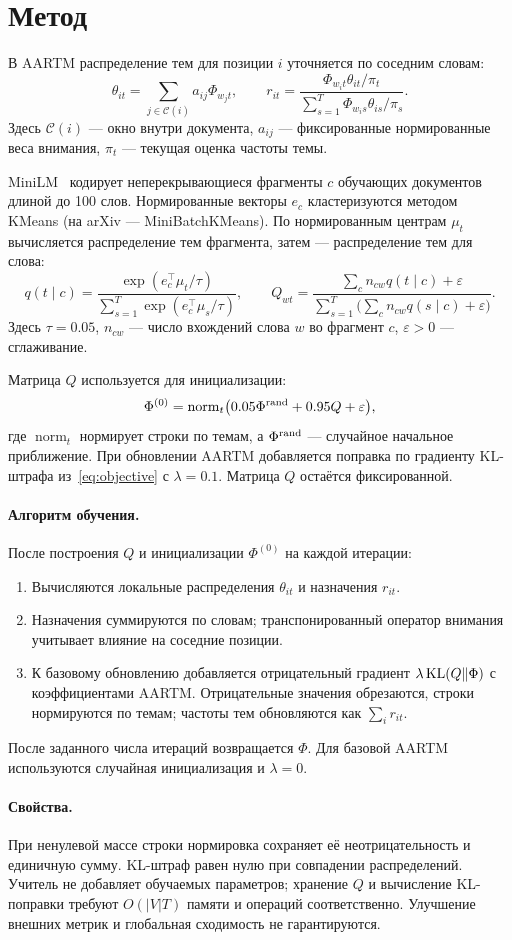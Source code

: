 \section{Метод}
В AARTM распределение тем для позиции $i$ уточняется по соседним словам:
\[
 \theta_{it}=\sum_{j\in\mathcal C(i)}a_{ij}\Phi_{w_jt},\qquad
 r_{it}=\frac{\Phi_{w_it}\theta_{it}/\pi_t}
 {\sum_{s=1}^{T}\Phi_{w_is}\theta_{is}/\pi_s}.
\]
Здесь $\mathcal C(i)$ --- окно внутри документа, $a_{ij}$ --- фиксированные нормированные веса внимания, $\pi_t$ --- текущая оценка частоты темы.

MiniLM~\cite{minilmcard} кодирует неперекрывающиеся фрагменты $c$ обучающих документов длиной до 100 слов. Нормированные векторы $e_c$ кластеризуются методом KMeans (на arXiv --- MiniBatchKMeans). По нормированным центрам $\mu_t$ вычисляется распределение тем фрагмента, затем --- распределение тем для слова:
\[
 q(t\mid c)=\frac{\exp(e_c^\top\mu_t/\tau)}
 {\sum_{s=1}^{T}\exp(e_c^\top\mu_s/\tau)},\qquad
 Q_{wt}=\frac{\sum_c n_{cw}q(t\mid c)+\varepsilon}
 {\sum_{s=1}^{T}\bigl(\sum_c n_{cw}q(s\mid c)+\varepsilon\bigr)}.
\]
Здесь $\tau=0.05$, $n_{cw}$ --- число вхождений слова $w$ во фрагмент $c$, $\varepsilon>0$ --- сглаживание.

Матрица $Q$ используется для инициализации:
\[
 \Phi^{(0)}=\operatorname{norm}_{t}\bigl(0.05\Phi^{\rm rand}+0.95Q+\varepsilon\bigr),
\]
где $\operatorname{norm}_t$ нормирует строки по темам, а $\Phi^{\rm rand}$ --- случайное начальное приближение. При обновлении AARTM добавляется поправка по градиенту KL-штрафа из~\eqref{eq:objective} с $\lambda=0.1$. Матрица $Q$ остаётся фиксированной.

\paragraph{Алгоритм обучения.}
После построения $Q$ и инициализации $\Phi^{(0)}$ на каждой итерации:
\begin{enumerate}
\setlength{\itemsep}{0pt}
\item Вычисляются локальные распределения $\theta_{it}$ и назначения $r_{it}$.
\item Назначения суммируются по словам; транспонированный оператор внимания учитывает влияние на соседние позиции.
\item К базовому обновлению добавляется отрицательный градиент $\lambda\operatorname{KL}(Q\Vert\Phi)$ с коэффициентами AARTM. Отрицательные значения обрезаются, строки нормируются по темам; частоты тем обновляются как $\sum_i r_{it}$.
\end{enumerate}
После заданного числа итераций возвращается $\Phi$. Для базовой AARTM используются случайная инициализация и $\lambda=0$.

\paragraph{Свойства.}
При ненулевой массе строки нормировка сохраняет её неотрицательность и единичную сумму. KL-штраф равен нулю при совпадении распределений. Учитель не добавляет обучаемых параметров; хранение $Q$ и вычисление KL-поправки требуют $O(|V|T)$ памяти и операций соответственно. Улучшение внешних метрик и глобальная сходимость не гарантируются.
